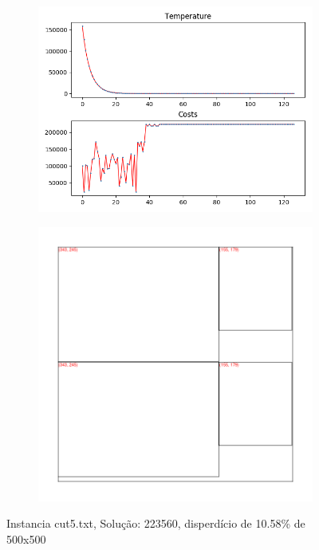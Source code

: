 \begin{figure}
\centering
\begin{subfigure}{.5\textwidth}
  \centering
  \includegraphics[width=1\linewidth]{results/cut5/1/plot}
  \label{fig:sub1}
\end{subfigure}%
\begin{subfigure}{.5\textwidth}
  \centering
  \includegraphics[width=1\linewidth]{results/cut5/1/cut}
  \label{fig:sub2}
\end{subfigure}
\caption{Instancia cut5.txt, Solução: 223560, disperdício de 10.58\% de 500x500}
\label{fig:test}
\end{figure}


